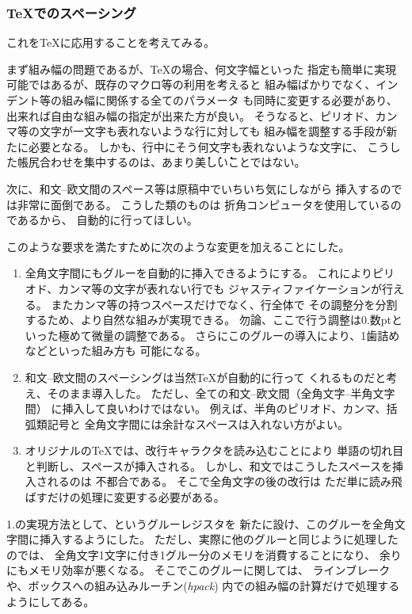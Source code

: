 \subsubsection{\TeX でのスペーシング}
これを\TeX に応用することを考えてみる。

まず組み幅の問題であるが、\TeX の場合、何文字幅といった
指定も簡単に実現可能ではあるが、既存のマクロ等の利用を考えると
組み幅ばかりでなく、インデント等の組み幅に関係する全てのパラメータ
も同時に変更する必要があり、出来れば自由な組み幅の指定が出来た方が良い。
そうなると、ピリオド、カンマ等の文字が一文字も表れないような行に対しても
組み幅を調整する手段が新たに必要となる。
しかも、行中にそう何文字も表れないような文字に、
こうした帳尻合わせを集中するのは、あまり\. 美\. し\. いことではない。

次に、和文--欧文間のスペース等は原稿中でいちいち気にしながら
挿入するのでは非常に面倒である。 こうした類のものは
折角コンピュータを使用しているのであるから、
自動的に行ってほしい。

このような要求を満たすために次のような変更を加えることにした。
\begin{enumerate}
\item 全角文字間にもグルーを自動的に挿入できるようにする。
	これによりピリオド、カンマ等の文字が表れない行でも
	ジャスティファイケーションが行える。
	またカンマ等の持つスペースだけでなく、行全体で
	その調整分を分割するため、より自然な組みが実現できる。
	勿論、ここで行う調整は0.数ptといった極めて微量の調整である。
	さらにこのグルーの導入により、1歯詰めなどといった組み方も
	可能になる。
\item 和文--欧文間のスペーシングは当然\TeX が自動的に行って
	くれるものだと考え、そのまま導入した。
	ただし、全ての和文--欧文間（全角文字--半角文字間）
	に挿入して良いわけではない。
	例えば、半角のピリオド、カンマ、括弧類記号と
	全角文字間には余計なスペースは入れない方がよい。
\item オリジナルの\TeX では、改行キャラクタを読み込むことにより
	単語の切れ目と判断し、スペースが挿入される。
	しかし、和文ではこうしたスペースを挿入されるのは
	不都合である。 そこで全角文字の後の改行は
	ただ単に読み飛ばすだけの処理に変更する必要がある。
\end{enumerate}

1.の実現方法として、{\bf{}}というグルーレジスタを
新たに設け、このグルーを全角文字間に挿入するようにした。
ただし、実際に他のグルーと同じように処理したのでは、
全角文字1文字に付き1グルー分のメモリを消費することになり、
余りにもメモリ効率が悪くなる。 そこでこのグルーに関しては、
ラインブレークや、ボックスへの組み込みルーチン({\it hpack})
内での組み幅の計算だけで処理するようにしてある。

